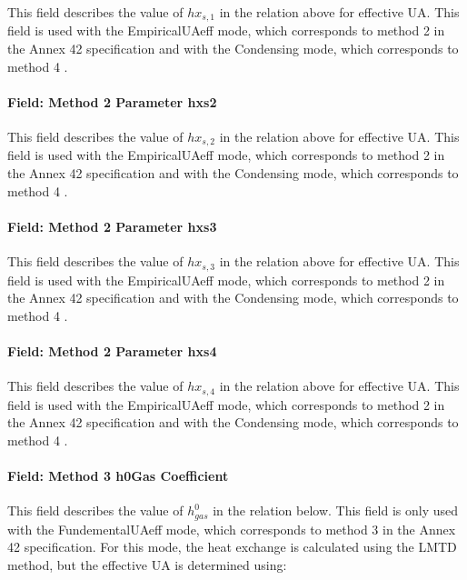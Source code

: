 This field describes the value of \(h{x_{s,1}}\) in the relation above for effective UA. This field is used with the EmpiricalUAeff mode, which corresponds to method 2 in the Annex 42 specification and with the Condensing mode, which corresponds to method 4 .

\paragraph{Field: Method 2 Parameter hxs2}\label{field-method-2-parameter-hxs2}

This field describes the value of \(h{x_{s,2}}\) in the relation above for effective UA. This field is used with the EmpiricalUAeff mode, which corresponds to method 2 in the Annex 42 specification and with the Condensing mode, which corresponds to method 4 .

\paragraph{Field: Method 2 Parameter hxs3}\label{field-method-2-parameter-hxs3}

This field describes the value of \(h{x_{s,3}}\) in the relation above for effective UA. This field is used with the EmpiricalUAeff mode, which corresponds to method 2 in the Annex 42 specification and with the Condensing mode, which corresponds to method 4 .

\paragraph{Field: Method 2 Parameter hxs4}\label{field-method-2-parameter-hxs4}

This field describes the value of \(h{x_{s,4}}\) in the relation above for effective UA. This field is used with the EmpiricalUAeff mode, which corresponds to method 2 in the Annex 42 specification and with the Condensing mode, which corresponds to method 4 .

\paragraph{Field: Method 3 h0Gas Coefficient}\label{field-method-3-h0gas-coefficient}

This field describes the value of \(h_{gas}^0\) in the relation below. This field is only used with the FundementalUAeff mode, which corresponds to method 3 in the Annex 42 specification. For this mode, the heat exchange is calculated using the LMTD method, but the effective UA is determined using:

